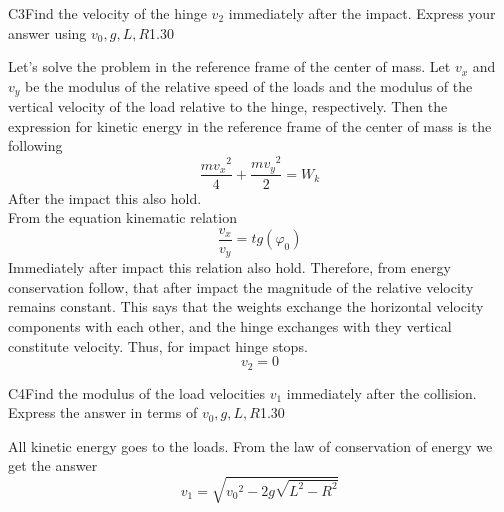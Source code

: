 \documentclass[11pt,a4paper]{article}
\begin{document}
\begin{solcard}{C3}{Find the velocity of the hinge $v_2$ immediately after the impact. Express your answer using ${v_0},g,{L},R$}{1.30}

Let's solve the problem in the reference frame of the center of mass. Let $v_x$ and $v_y$ be the modulus of the relative speed of the loads and the modulus of the vertical velocity of the load relative to the hinge, respectively. Then the expression for kinetic energy in the reference frame of the center of mass is the following $$\frac{m{v_x}^2}{4}+\frac{m{v_y}^2}{2}=W_k $$ After the impact this also hold. $$ $$ From the equation kinematic relation $$\frac{v_x}{v_y}=tg(\varphi_0) $$ Immediately after impact this relation also hold. Therefore, from energy conservation follow, that after impact the magnitude of the relative velocity remains constant. This says that the weights exchange the horizontal velocity components with each other, and the hinge exchanges with they vertical constitute velocity. Thus, for impact hinge stops. $$v_{2}=0 $$

\end{solcard}

\begin{solcard}{C4}{Find the modulus of the load velocities $v_1$ immediately after the collision. Express the answer in terms of ${v_0},g,{L},R$}{1.30}

All kinetic energy goes to the loads. From the law of conservation of energy we get the answer $$v_{1}=\sqrt{{v_0}^2-2g\sqrt{L^2-R^2}} $$

\end{solcard}
\end{document}
